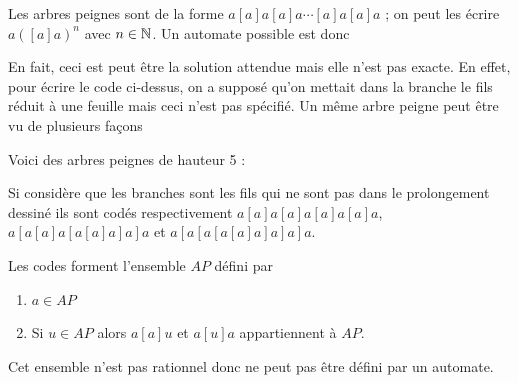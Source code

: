 \begin{Exercise}
Les arbres peignes sont de la forme $a[a]a[a]a\cdots [a]a[a]a$ ; on peut les écrire $a([a]a)^n$ avec $n\in {\mathbb N}$. Un automate possible est donc
\begin{center}
\end{center}
En fait, ceci est peut être la solution attendue mais elle n'est pas exacte. En effet, pour écrire le code ci-dessus, on a supposé qu'on mettait dans la branche le fils réduit à une feuille mais ceci n'est pas spécifié. Un même arbre peigne peut être vu de plusieurs façons

Voici des arbres peignes de hauteur 5 :

\begin{center}
\end{center}

Si considère que les branches sont les fils qui ne sont pas dans le prolongement dessiné ils sont codés respectivement $a[a]a[a]a[a]a[a]a$, $a[a[a]a[a[a]a]a]a$ et $a[a[a[a[a]a]a]a]a$.

Les codes forment l'ensemble $AP$ défini par
\begin{enumerate}
\item $a \in AP$
\item Si $u\in AP$ alors $a[a]u$ et $a[u]a$ appartiennent à $AP$.
\end{enumerate}
Cet ensemble n'est pas rationnel donc ne peut pas être défini par un automate.
\end{Exercise}
